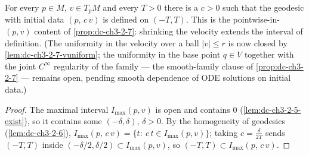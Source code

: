 \begin{lemma}
  \label{lem:dc-ch3-2-7-pointwise}


  For every $p\in M$, $v\in T_pM$ and every $T>0$ there is a $c>0$ such that
  the geodesic with initial data $(p,\,c\,v)$ is defined on $(-T,T)$. This is
  the pointwise-in-$(p,v)$ content of \cref{prop:dc-ch3-2-7}: shrinking the
  velocity extends the interval of definition. (The uniformity in the velocity
  over a ball $|v|\le r$ is now closed by \cref{lem:dc-ch3-2-7-vuniform}; the
  uniformity in the base point $q \in V$ together with the joint $C^\infty$
  regularity of the family — the smooth-family clause of
  \cref{prop:dc-ch3-2-7} — remains open, pending smooth dependence of ODE
  solutions on initial data.)
\end{lemma}
\begin{proof}
  \sketch

  The maximal interval $I_{\max}(p,v)$ is open and contains $0$
  (\cref{lem:dc-ch3-2-5-exist}), so it contains some $(-\delta,\delta)$,
  $\delta>0$. By the homogeneity of geodesics (\cref{lem:dc-ch3-2-6}),
  $I_{\max}(p,\,c\,v)=\{t:\ c\,t\in I_{\max}(p,v)\}$; taking
  $c=\frac{\delta}{2T}$ sends $(-T,T)$ inside $(-\delta/2,\delta/2)\subset
  I_{\max}(p,v)$, so $(-T,T)\subset I_{\max}(p,\,c\,v)$.
\end{proof}

